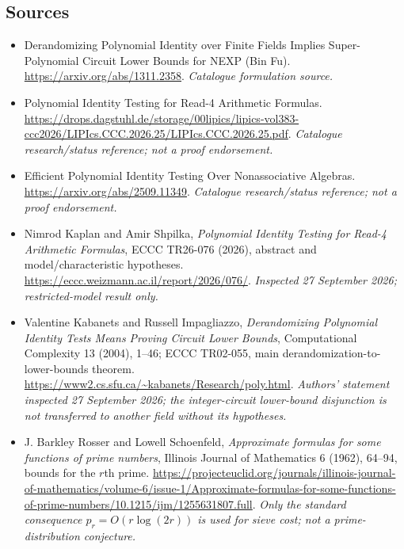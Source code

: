 \documentclass[11pt,a4paper]{article}
\numberwithin{equation}{section}
\begin{document}
\subsection{Sources}
\begin{itemize}\raggedright
\item[\textnormal{[S1]}]\hypertarget{source:70:1}{} Derandomizing Polynomial Identity over Finite Fields Implies Super-Polynomial Circuit Lower Bounds for NEXP (Bin Fu).
\url{https://arxiv.org/abs/1311.2358}.
{\small\textit{Catalogue formulation source.}}
\item[\textnormal{[S2]}]\hypertarget{source:70:2}{} Polynomial Identity Testing for Read-4 Arithmetic Formulas.
\url{https://drops.dagstuhl.de/storage/00lipics/lipics-vol383-ccc2026/LIPIcs.CCC.2026.25/LIPIcs.CCC.2026.25.pdf}.
{\small\textit{Catalogue research/status reference; not a proof endorsement.}}
\item[\textnormal{[S3]}]\hypertarget{source:70:3}{} Efficient Polynomial Identity Testing Over Nonassociative Algebras.
\url{https://arxiv.org/abs/2509.11349}.
{\small\textit{Catalogue research/status reference; not a proof endorsement.}}
\item[\textnormal{[E1]}]\hypertarget{extra:70:1}{} Nimrod Kaplan and Amir Shpilka,
\emph{Polynomial Identity Testing for Read-4 Arithmetic Formulas},
ECCC TR26-076 (2026), abstract and model/characteristic hypotheses.
\url{https://eccc.weizmann.ac.il/report/2026/076/}.
{\small\textit{Inspected 27 September 2026; restricted-model result only.}}
\item[\textnormal{[E2]}]\hypertarget{extra:70:2}{} Valentine Kabanets and Russell Impagliazzo,
\emph{Derandomizing Polynomial Identity Tests Means Proving Circuit Lower Bounds},
Computational Complexity 13 (2004), 1--46; ECCC TR02-055,
main derandomization-to-lower-bounds theorem.
\url{https://www2.cs.sfu.ca/~kabanets/Research/poly.html}.
{\small\textit{Authors' statement inspected 27 September 2026; the integer-circuit
lower-bound disjunction is not transferred to another field without its hypotheses.}}
\item[\textnormal{[E3]}]\hypertarget{extra:70:3}{} J. Barkley Rosser and Lowell Schoenfeld,
\emph{Approximate formulas for some functions of prime numbers},
Illinois Journal of Mathematics 6 (1962), 64--94, bounds for the $r$th prime.
\url{https://projecteuclid.org/journals/illinois-journal-of-mathematics/volume-6/issue-1/Approximate-formulas-for-some-functions-of-prime-numbers/10.1215/ijm/1255631807.full}.
{\small\textit{Only the standard consequence $p_r=O(r\log(2r))$ is used for
sieve cost; not a prime-distribution conjecture.}}
\end{itemize}
\end{document}
